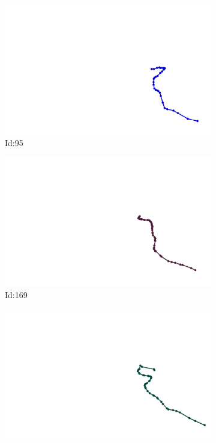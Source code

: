 \documentclass[12pt,twoside]{report}
\begin{document}
\begin{figure}
\centering
\begin{subfigure}[b]{0.20\textwidth}
\centering
\includegraphics[width=\textwidth]{../../trajectories/95.png}
\caption{Id:95}
\end{subfigure}
\begin{subfigure}[b]{0.20\textwidth}
\centering
\includegraphics[width=\textwidth]{../../trajectories/169.png}
\caption{Id:169}
\end{subfigure}
\begin{subfigure}[b]{0.20\textwidth}
\centering
\includegraphics[width=\textwidth]{../../trajectories/311.png}

\end{subfigure}
\end{figure}
\end{document}
